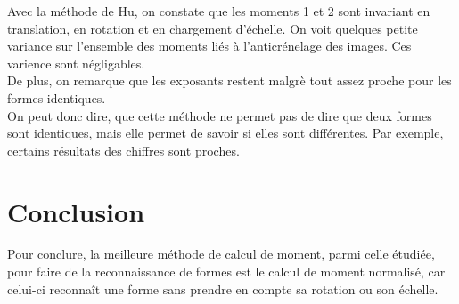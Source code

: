 \documentclass{article}
\begin{document}
  
  Avec la méthode de Hu, on constate que les moments 1 et 2 sont invariant en translation, en 
  rotation et en chargement d'échelle. On voit quelques petite variance sur l'ensemble des 
  moments liés à l'anticrénelage des images. Ces varience sont négligables.\\
  
  De plus, on remarque que les exposants restent malgrè tout assez proche pour les formes identiques.\\ 
  
  On peut donc dire, que cette méthode ne permet pas de dire que deux formes sont identiques, mais 
  elle permet de savoir si elles sont différentes. Par exemple, certains résultats des chiffres sont 
  proches.
  
  \section{Conclusion}
  Pour conclure, la meilleure méthode de calcul de moment, parmi celle étudiée, pour faire de la 
  reconnaissance  de formes est le calcul de moment normalisé, car celui-ci reconnaît une forme 
  sans prendre en compte sa rotation ou son échelle.
    
\end{document}
